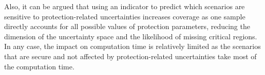 Also, it can be argued that using an indicator to predict which scenarios are sensitive to protection-related uncertainties increases coverage as one sample directly accounts for all possible values of protection parameters, reducing the dimension of the uncertainty space and the likelihood of missing critical regions. In any case, the impact on computation time is relatively limited as the scenarios that are secure and not affected by protection-related uncertainties take most of the computation time.


%
%
%



